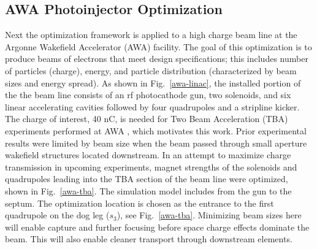 \subsection{AWA Photoinjector Optimization} \label{awaproblem}
Next the optimization framework is applied to a high charge beam line
 at the Argonne Wakefield Accelerator (AWA) facility. 
The goal of this optimization is to produce beams of electrons that meet 
design specifications; this includes number of particles (charge), energy, and particle distribution (characterized by beam sizes and energy spread).
As shown in Fig.~\ref{awa-linac}, the installed portion of the the 
beam line consists of an rf photocathode gun, 
two solenoids, and six linear accelerating cavities
followed by four quadrupoles and a stripline kicker. 
The charge of interest, 40 nC, is needed for Two Beam 
Acceleration (TBA) 
experiments performed at AWA \cite{gai_power_jing_2012,JING201872}, 
which motivates this work. 
Prior experimental results were limited by beam size when the beam passed through small aperture 
wakefield structures located downstream. 
In an attempt to maximize charge transmission in upcoming experiments,
magnet strengths of the solenoids and quadrupoles leading into the 
TBA section of the beam line were optimized, shown in Fig.~\ref{awa-tba}.
The simulation model includes from the gun to the septum.
The optimization location is chosen as the  
entrance to the first quadrupole on the dog leg ($s_3$), see Fig.~\ref{awa-tba}.
Minimizing beam sizes here will enable capture and further focusing before space charge effects dominate the beam. 
This will also enable cleaner transport through downstream elements.

